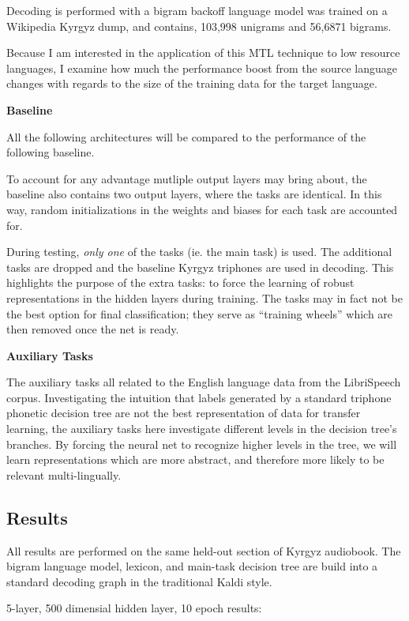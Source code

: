 \documentclass[a4paper]{article}
\begin{document}
Decoding is performed with a bigram backoff language model was trained on a Wikipedia Kyrgyz dump, and contains, 103,998 unigrams and 56,6871 bigrams.



Because I am interested in the application of this MTL technique to low resource languages, I examine how much the performance boost from the source language changes with regards to the size of the training data for the target language.


\textbf{Baseline}

All the following architectures will be compared to the performance of the following baseline.

To account for any advantage mutliple output layers may bring about, the baseline also contains two output layers, where the tasks are identical. In this way, random initializations in the weights and biases for each task are accounted for.

During testing, \textit{only one} of the tasks (ie. the main task) is used. The additional tasks are dropped and the baseline Kyrgyz triphones are used in decoding. This highlights the purpose of the extra tasks: to force the learning of robust representations in the hidden layers during training. The tasks may in fact not be the best option for final classification; they serve as ``training wheels'' which are then removed once the net is ready.


\textbf{Auxiliary Tasks}

The auxiliary tasks all related to the English language data from the LibriSpeech corpus. Investigating the intuition that labels generated by a standard triphone phonetic decision tree are not the best representation of data for transfer learning, the auxiliary tasks here investigate different levels in the decision tree's branches. By forcing the neural net to recognize higher levels in the tree, we will learn representations which are more abstract, and therefore more likely to be relevant multi-lingually. 

\subsection{Results}


All results are performed on the same held-out section of Kyrgyz audiobook. The bigram language model, lexicon, and main-task decision tree are build into a standard decoding graph in the traditional Kaldi style.

5-layer, 500 dimensial hidden layer, 10 epoch results:
\end{document}
